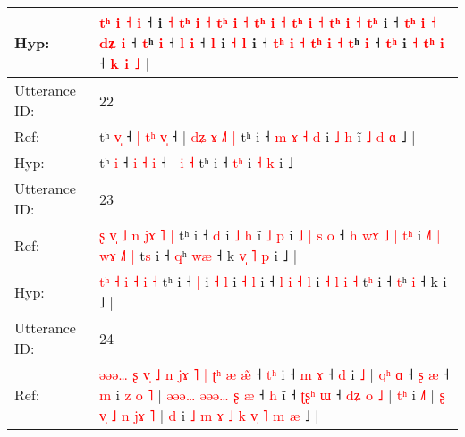 \documentclass[10pt]{article}
\DeclareRobustCommand{\hl}[1]{{\textcolor{red}{#1}}}
\begin{document}
\begin{longtable}{ll}
 \\
Hyp: & \hl{}\hl{t}\hl{ʰ} \hl{i} \hl{˧} \hl{i} ˧\hl{}\hl{} i\hl{}\hl{} \hl{}\hl{˧} \hl{}\hl{t}\hl{ʰ} \hl{i} \hl{˧} \hl{t}\hl{ʰ} \hl{i} \hl{˧} \hl{}\hl{}\hl{t}\hl{ʰ} \hl{i} \hl{˧} \hl{t}\hl{ʰ} \hl{i} \hl{˧} \hl{t}\hl{ʰ} \hl{i} \hl{˧} \hl{t}\hl{ʰ} i ˧\hl{}\hl{}\hl{}\hl{} \hl{}\hl{t}\hl{ʰ} \hl{i} \hl{˧} \hl{}\hl{d}\hl{ʑ} \hl{i} ˧\hl{}\hl{}\hl{} \hl{}\hl{t}ʰ \hl{i} ˧ \hl{l} \hl{i} ˧ \hl{l} i\hl{}\hl{} \hl{˧} \hl{}\hl{l} i ˧\hl{}\hl{}\hl{}\hl{} \hl{}\hl{t}\hl{ʰ} \hl{}\hl{i} \hl{˧} \hl{}\hl{t}\hl{ʰ} \hl{i} \hl{˧} \hl{}\hl{t}ʰ \hl{i} ˧\hl{}\hl{}\hl{}\hl{} \hl{}\hl{t}\hl{ʰ} i \hl{˧} \hl{}\hl{t}\hl{ʰ} \hl{i} ˧ \hl{}\hl{k} \hl{i} \hl{˩} |
 \\
\midrule
Utterance ID: & 22 \\
Ref: & tʰ \hl{v}\hl{̩} ˧ \hl{|} \hl{t}\hl{ʰ} \hl{v}\hl{̩} ˧ |\hl{ }\hl{d}\hl{ʑ}\hl{ }\hl{ɤ} \hl{˩}\hl{˥} \hl{|} tʰ i ˧\hl{ }\hl{m}\hl{ }\hl{ɤ} \hl{˧}\hl{ }\hl{d} i \hl{˩} \hl{h} i\hl{̃}\hl{ }\hl{˩}\hl{ }\hl{d}\hl{ }\hl{ɑ} ˩ |
 \\
Hyp: & tʰ \hl{}\hl{i} ˧ \hl{i} \hl{}\hl{˧} \hl{}\hl{i} ˧ |\hl{}\hl{}\hl{}\hl{}\hl{} \hl{}\hl{i} \hl{˧} tʰ i ˧\hl{}\hl{}\hl{}\hl{} \hl{}\hl{t}\hl{ʰ} i \hl{˧} \hl{k} i\hl{}\hl{}\hl{}\hl{}\hl{}\hl{}\hl{} ˩ |
 \\
\midrule
Utterance ID: & 23 \\
Ref: & \hl{ʂ}\hl{ }\hl{v}\hl{̩} \hl{˩} \hl{n} \hl{j}\hl{ɤ} \hl{˥} \hl{|} tʰ i ˧ \hl{d} i \hl{˩} \hl{h} i\hl{̃} \hl{˩} \hl{p} i\hl{ }\hl{˩}\hl{ }\hl{|}\hl{ }\hl{s}\hl{ }\hl{o} ˧\hl{ }\hl{h} \hl{w}\hl{ɤ} \hl{˩} \hl{|} \hl{t}\hl{ʰ} i\hl{ }\hl{˩}\hl{˥} \hl{|} \hl{w}\hl{ɤ} \hl{˩}\hl{˥} \hl{|} t\hl{s} i ˧ \hl{q}ʰ \hl{w}\hl{æ} ˧ k\hl{ }\hl{v}\hl{̩}\hl{ }\hl{˥}\hl{ }\hl{p} i ˩ |
 \\
Hyp: & \hl{}\hl{}\hl{t}\hl{ʰ} \hl{˧} \hl{i} \hl{}\hl{˧} \hl{i} \hl{˧} tʰ i ˧ \hl{|} i \hl{˧} \hl{l} i\hl{} \hl{˧} \hl{l} i\hl{}\hl{}\hl{}\hl{}\hl{}\hl{}\hl{}\hl{} ˧\hl{}\hl{} \hl{}\hl{l} \hl{i} \hl{˧} \hl{}\hl{l} i\hl{}\hl{}\hl{} \hl{˧} \hl{}\hl{l} \hl{}\hl{i} \hl{˧} t\hl{ʰ} i ˧ \hl{t}ʰ \hl{}\hl{i} ˧ k\hl{}\hl{}\hl{}\hl{}\hl{}\hl{}\hl{} i ˩ |
 \\
\midrule
Utterance ID: & 24 \\
Ref: & \hl{ə}\hl{ə}\hl{ə}\hl{…}\hl{ }\hl{ʂ} \hl{v}\hl{̩} \hl{˩} \hl{n} \hl{j}\hl{ɤ} \hl{˥} \hl{|} \hl{ʈ}\hl{ʰ} \hl{æ} \hl{æ}\hl{̃} ˧ \hl{t}\hl{ʰ} i ˧ \hl{m} \hl{ɤ} ˧ \hl{d} i \hl{˩} |\hl{ }\hl{q}\hl{ʰ} \hl{ɑ} ˧ \hl{ʂ} \hl{æ} ˧ \hl{m} i\hl{ }\hl{z}\hl{ }\hl{o} \hl{˥} | \hl{ə}\hl{ə}\hl{ə}\hl{…} \hl{ə}\hl{ə}\hl{ə}\hl{…} \hl{ʂ} \hl{æ} ˧ \hl{h} i\hl{̃} ˧ \hl{ʈ}\hl{ʂ}\hl{ʰ} \hl{ɯ} ˧ \hl{d}\hl{ʑ} \hl{o} \hl{˩} |\hl{ }\hl{t}\hl{ʰ} i \hl{˩}\hl{˥} |\hl{ }\hl{ʂ} \hl{v}\hl{̩} \hl{˩} \hl{n} \hl{j}\hl{ɤ} \hl{˥} |\hl{ }\hl{d} i \hl{˩} \hl{m} \hl{ɤ} \hl{˩} \hl{k}\hl{ }\hl{v}\hl{̩} \hl{˥} \hl{m} \hl{æ} ˩ |

\end{longtable}
\end{document}
